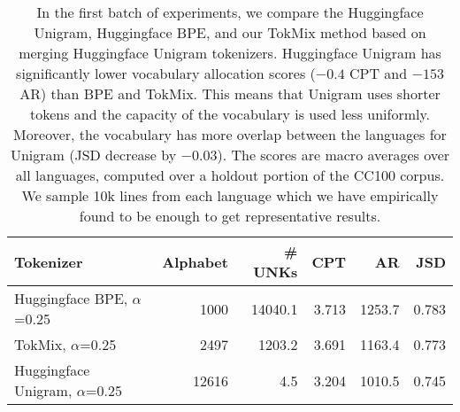 \begin{table}
\caption{In the first batch of experiments, we compare the Huggingface Unigram, Huggingface BPE, and our TokMix method based on merging Huggingface Unigram tokenizers. Huggingface Unigram has significantly lower vocabulary allocation scores ($-0.4$ CPT and $-153$ AR) than BPE and TokMix. This means that Unigram uses shorter tokens and the capacity of the vocabulary is used less uniformly. Moreover, the vocabulary has more overlap between the languages for Unigram (JSD decrease by $-0.03$).  The scores are macro averages over all languages, computed over a holdout portion of the CC100 corpus. We sample 10k lines from each language which we have empirically found to be enough to get representative results.}
\label{tab:20l_metrics}
\begin{tabular}{lrrrrr}
\toprule
Tokenizer & Alphabet & \# UNKs & CPT & AR & JSD \\
\midrule
Huggingface BPE, $\alpha$=0.25 & 1000 & 14040.1 & 3.713 & 1253.7 & 0.783 \\
TokMix, $\alpha$=0.25 & 2497 & 1203.2 & 3.691 & 1163.4 & 0.773 \\
Huggingface Unigram, $\alpha$=0.25 & 12616 & 4.5 & 3.204 & 1010.5 & 0.745 \\
\bottomrule
\end{tabular}
\end{table}
